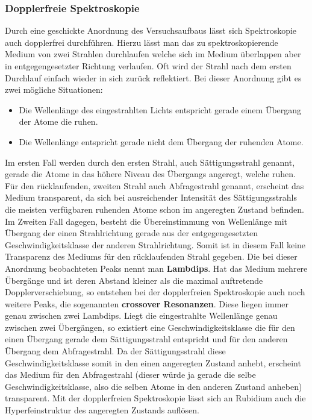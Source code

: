 \documentclass[12pt]{article}
\begin{document}
\subsubsection{Dopplerfreie Spektroskopie}
Durch eine geschickte Anordnung des Versuchsaufbaus lässt sich Spektroskopie auch dopplerfrei durchführen.
Hierzu lässt man das zu spektroskopierende Medium von zwei Strahlen durchlaufen welche sich im Medium überlappen aber in entgegengesetzter Richtung verlaufen. Oft wird der Strahl nach dem ersten Durchlauf einfach wieder in sich zurück reflektiert. Bei dieser Anordnung gibt es zwei mögliche Situationen:
\begin{itemize}
 \item Die Wellenlänge des eingestrahlten Lichts entspricht gerade einem Übergang der Atome die ruhen.
 \item Die Wellenlänge entspricht gerade nicht dem Übergang der ruhenden Atome.
\end{itemize}
Im ersten Fall werden durch den ersten Strahl, auch Sättigungsstrahl genannt, gerade die Atome in das höhere Niveau des Übergangs angeregt, welche ruhen. Für den rücklaufenden, zweiten Strahl auch Abfragestrahl genannt, erscheint das Medium transparent, da sich bei ausreichender Intensität des Sättigungsstrahls die meisten verfügbaren ruhenden Atome schon im angeregten Zustand befinden. Im Zweiten Fall dagegen, besteht die Übereinstimmung von Wellenlänge mit Übergang der einen Strahlrichtung gerade aus der entgegengesetzten Geschwindigkeitsklasse der anderen Strahlrichtung. Somit ist in diesem Fall keine Transparenz des Mediums für den rücklaufenden Strahl gegeben. Die bei dieser Anordnung beobachteten Peaks nennt man \textbf{Lambdips}. Hat das Medium mehrere Übergänge und ist deren Abstand kleiner als die maximal auftretende Dopplerverschiebung, so entstehen bei der dopplerfreien Spektroskopie auch noch weitere Peaks, die sogenannten \textbf{crossover Resonanzen}. Diese liegen immer genau zwischen zwei Lambdips. Liegt die eingestrahlte Wellenlänge genau zwischen zwei Übergängen, so existiert eine Geschwindigkeitsklasse die für den einen Übergang gerade dem Sättigungsstrahl entspricht und für den anderen Übergang dem Abfragestrahl. Da der Sättigungsstrahl diese Geschwindigkeitsklasse somit in den einen angeregten Zustand anhebt, erscheint das Medium für den Abfragestrahl (dieser würde ja gerade die selbe Geschwindigkeitsklasse, also die selben Atome in den anderen Zustand anheben) transparent. Mit der dopplerfreien Spektroskopie lässt sich an Rubidium auch die Hyperfeinstruktur des angeregten Zustands auflösen.
\end{document}
